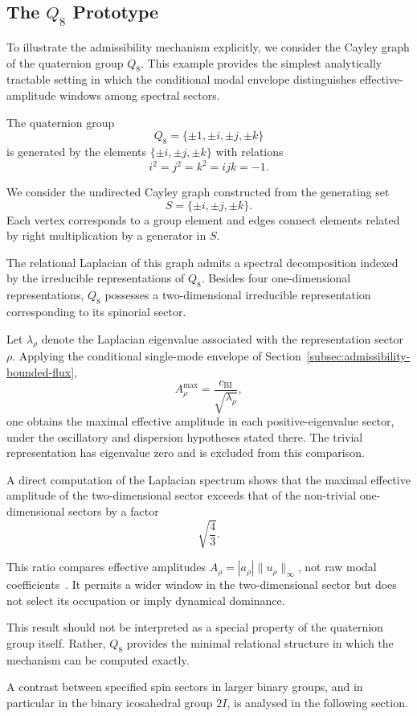 \subsection{The $Q_8$ Prototype}
  \label{subsec:q8-prototype}

  To illustrate the admissibility mechanism explicitly, we consider the
  Cayley graph of the quaternion group $Q_8$.
  This example provides the simplest analytically tractable setting in which the
  conditional modal envelope distinguishes effective-amplitude windows among spectral sectors.

  The quaternion group
  \[
    Q_8=\{\pm 1,\pm i,\pm j,\pm k\}
  \]
  is generated by the elements $\{\pm i,\pm j,\pm k\}$ with relations
  \[
    i^2=j^2=k^2=ijk=-1 .
  \]

  We consider the undirected Cayley graph constructed from the generating set
  \[
    S=\{\pm i,\pm j,\pm k\}.
  \]
  Each vertex corresponds to a group element and edges connect elements related
  by right multiplication by a generator in $S$.

  The relational Laplacian of this graph admits a spectral decomposition indexed
  by the irreducible representations of $Q_8$.
  Besides four one-dimensional representations, $Q_8$ possesses a
  two-dimensional irreducible representation corresponding to its spinorial
  sector.

  Let $\lambda_\rho$ denote the Laplacian eigenvalue associated with the
  representation sector $\rho$.
  Applying the conditional single-mode envelope of
  Section~\ref{subsec:admissibility-bounded-flux},
  \[
    A_\rho^{\max}=\frac{c_{\mathrm{BI}}}{\sqrt{\lambda_\rho}},
  \]
  one obtains the maximal effective amplitude in each positive-eigenvalue sector, under the
  oscillatory and dispersion hypotheses stated there.
  The trivial representation has eigenvalue zero and is excluded from this comparison.

  A direct computation of the Laplacian spectrum shows that the maximal effective
  amplitude of the two-dimensional sector exceeds that of the non-trivial one-dimensional
  sectors by a factor
  \[
    \sqrt{\frac{4}{3}} .
  \]

  This ratio compares effective amplitudes $A_\rho=|a_\rho|\|u_\rho\|_\infty$,
  not raw modal coefficients~\cite{Beau2026a1}.
  It permits a wider window in the two-dimensional sector but does not select its occupation
  or imply dynamical dominance.

  This result should not be interpreted as a special property of the quaternion
  group itself.
  Rather, $Q_8$ provides the minimal relational structure in which the mechanism
  can be computed exactly.

  A contrast between specified spin sectors in larger binary groups, and in particular
  in the binary icosahedral group $2I$, is analysed in the following section.
